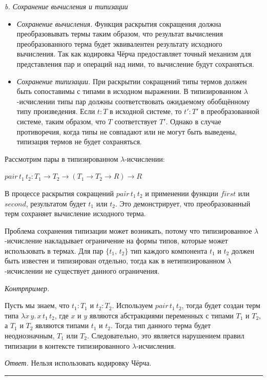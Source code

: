 \documentclass[landscape, 11pt]{report}
\begin{document}
	\textit{b. Сохранение вычисления и типизации}

	\begin{itemize}
		\item[] \textit{Сохранение вычисления.} Функция раскрытия сокращения должна преобразовывать термы таким образом, что результат вычисления преобразованного терма будет эквивалентен результату исходного вычисления. Так как кодировка Чёрча предоставляет точный механизм для представления пар и операций над ними, то вычисление будут сохраняться.
		\item[] \textit{Сохранение типизации.} При раскрытии сокращений типы термов должен быть сопоставимы с типами в исходном выражении. В типизированном $\lambda$-исчислении типы пар должны соответствовать ожидаемому обобщённому типу произведения. Если ${t : T}$ в исходной системе, то ${t' : T'}$ в преобразованной системе, таким образом, что $T$ соответствует $T'$. Однако в случае противоречия, когда типы не совпадают или не могут быть выведены, типизация термов не будет сохраняться.
	\end{itemize}

	\newpage
	
	Рассмотрим пары в типизированном $\lambda$-исчислении:
	
	\begin{center}
		$pair \, t_1 \, t_2 : T_1 \rightarrow T_2 \rightarrow (T_1 \rightarrow T_2 \rightarrow R) \rightarrow R$
	\end{center}

	В процессе раскрытия сокращений $pair \, t_1 \, t_2$ и применении функции $first$ или $second$, результатом будет $t_1$ или $t_2$. Это демонстрирует, что преобразованный терм сохраняет вычисление исходного терма.
	
	\vspace{0.2cm}
	
	Проблема сохранения типизации может возникать, потому что типизированное $\lambda$-исчисление накладывает ограничение на формы типов, которые может использовать в термах. Для пар $\{t_1, \, t_2\}$ тип каждого компонента $t_1$ и $t_2$ должен быть известен и типизирован отдельно, тогда как в нетипизированном $\lambda$-исчислении не существует данного ограничения.

	\vspace{0.5cm}
	
	\textit{Контрпример.}
	
	Пусть мы знаем, что $t_1 : T_1$ и $t_2 : T_2$. Используем $pair \, t_1 \, t_2$, тогда будет создан терм типа $\lambda x \, y . \, x \, t_1 \, t_2$, где $x$ и $y$ являются абстракциями переменных с типами $T_1$ и $T_2$, а $T_1$ и $T_2$ являются типами $t_1$ и $t_2$. Тогда тип данного терма будет неоднозначным, $T_1$ или $T_2$. Следовательно, это является нарушением правил типизации в контексте типизированного $\lambda$-исчисления.
	
	\vspace{0.5cm}
	
	\textit{Ответ.} Нельзя использовать кодировку Чёрча.

	\vspace{0.5cm}
	\hrule
	\vspace{0.5cm}
\end{document}
